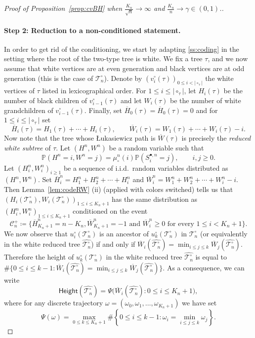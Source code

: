 \documentclass[AHL,XML,longabstracts,Unicode]{cedram}
\providecommand{\abs}[1]{\lvert#1\rvert}
\def\mucn{\mu_{\circ}^{n}}
\def\Sbn{S^{\bullet,n}}
\def\oH{\overline{H}}
\def\Ts{\mathscr{T}}
\renewcommand\Pr[1]{\mathbb{P}\left(#1\right)}
\begin{document}
\begin{proof}[Proof of  Proposition~\ref{prop:cvBH}  when $\tfrac{K_{n}}{\sqrt{n}} \rightarrow \infty$ and $ \tfrac{K_{n}}{n}  \rightarrow \gamma \in (0,1)$.]
\paragraph*{Step 2: Reduction to a non-conditioned statement.}
In order to get rid of the conditioning, we start by adapting \cref{ss:coding} in the setting where the root of the two-type tree is white. We fix a tree $\tau$, and we now assume that white vertices are at even generation and black vertices are at odd generation (this is the case of $\Ts^{\circ}_{n}$).  Denote by $(v^{\circ}_{i}(\tau))_{0 \leq i < \abs{\circ_{\tau}}} $ the white vertices of $\tau$ listed in lexicographical order.  For $1 \leq i \leq \abs{\circ_{\tau}}$, let $H_{i}(\tau)$ be the number of black children of $v^{\circ}_{i-1}(\tau)$ and let $W_{i}(\tau)$ be the number of white grandchildren of $v^{\circ}_{i-1}(\tau)$. Finally, set $\oH_{0}(\tau)=\oH_{0}(\tau)=0$ and  for $1 \leq i \leq \abs{\circ_{\tau}}$ set
\[\oH_{i}(\tau)=H_{1}(\tau)+ \cdots+H_{i}(\tau), \qquad  \overline{W}_{i}(\tau)=W_{1}(\tau)+ \cdots+W_{i}(\tau)-i.\]
Now note that the tree whose {\L}ukasiewicz path is $\overline{W}(\tau)$ is precisely the \emph{reduced white subtree} of $\tau$.
Let $(H^{n},W^{n})$ be a random variable such that
 \begin{equation}
    \Pr{H^{n}=i,W^{n}=j}=\mucn(i) \Pr{\Sbn_{i}=j}, \qquad  i, j \geq 0.
    \label{eq:HW}
  \end{equation}
Let $(H^{n}_{i},W^{n}_{i})_{i \geq 1}$ be a sequence of i.i.d.~random variables distributed as $(H^{n},W^{n})$. Set $\overline{H}^{n}_{i}=H^{n}_{1}+H^{n}_{2}+ \cdots+H^{n}_{i}$ and  $\overline{W}^{n}_{i}=W_{1}^{n}+W^{n}_{2}+ \cdots+W^{n}_{i}-i$. Then Lemma~\ref{lem:codeRW} (ii) (applied with colors switched) tells us that $(H_{i}(\Ts_{n}^{\circ}) ,W_{i}(\Ts_{n}^{\circ}))_{1 \leq i \leq K_{n}+1}$ has the same distribution as $(H^{n}_{i},W^{n}_{i})_{1 \leq i \leq K_{n}+1}$ conditioned on the event
\[ \mathcal{C}^{+}_{n} \coloneqq \{\oH^{n}_{K_{n}+1}=n-K_{n},\overline{W}^{n}_{K_{n}+1}=-1 \textrm{ and } \overline{W}^{n}_{i} \geq 0 \textrm{ for every } 1 \leq i < K_{n}+1\}.\]
We now observe that $u^{\circ}_{i}(\Ts^{\circ}_{n})$ is an ancestor of $u^{\circ}_{k}(\Ts^{\circ}_{n})$ in $\Ts^{\circ}_{n}$
(or equivalently in the white reduced tree $\hat{\Ts^{\circ}_{n}}$)
if and only if $\overline{W}_{i}(\hat{\Ts^{\circ}_{n}})=\min_{i \leq j \leq k}  \overline{W}_{j}(\hat{\Ts^{\circ}_{n}})$.
Therefore the height of $u^{\circ}_{k}(\Ts^{\circ}_{n})$ in the white reduced tree $\hat{\Ts^{\circ}_{n}}$
 is equal to $ \# \{0 \leq i \leq k-1: \overline{W}_{i}(\hat{\Ts^{\circ}_{n}})=\min_{i \leq j \leq k}  \overline{W}_{j}(\hat{\Ts^{\circ}_{n}}) \}$. As a consequence, we can write
\[\mathsf{Height}(\hat{\Ts^{\circ}_{n}})= \Psi\big(  \overline{W}_{i}(\hat{\Ts^{\circ}_{n}}) :0 \leq i \leq K_{n}+1 \big),\]
where for any discrete trajectory $\omega=(\omega_{0},\omega_{1}, \ldots, \omega_{K_{n}+1})$ we have set
\[\Psi(\omega)= \max_{0 \leq k \leq K_{n}+1} \# \left\{0 \leq i \leq k-1: \omega_{i}=\min_{i \leq j \leq k}  \omega_{j} \right \}.\]



\end{proof}
\end{document}
